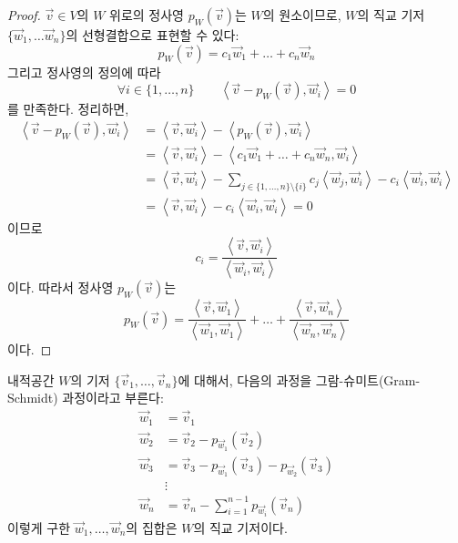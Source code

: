 \documentclass[sections/engineering_mathematics_lecture_note.tex]{subfiles}
\begin{document}
\begin{proof}
    $\vec v \in V$의 $W$ 위로의 정사영 $p_W (\vec v)$는 $W$의 원소이므로, $W$의 직교 기저 $\{\vec w_1, \dots \vec w_n\}$의 선형결합으로 표현할 수 있다:
    \begin{equation*}
        p_W (\vec v) = c_1 \vec w_1 + \dots + c_n \vec w_n
    \end{equation*}
    그리고 정사영의 정의에 따라
    \begin{equation*}
        \forall i \in \{1, \dots, n\} \qquad \left<\vec v - p_W (\vec v), \vec w_i\right> = 0
    \end{equation*}
    를 만족한다.
    정리하면,
    \begin{align*}
        \left<\vec v - p_W (\vec v), \vec w_i\right> &= \left<\vec v, \vec w_i\right> - \left<p_W (\vec v), \vec w_i\right>\\
                                                     &= \left<\vec v, \vec w_i \right> - \left<c_1 \vec w_1 + \dots + c_n \vec w_n, \vec w_i\right>\\
                                                     &= \left<\vec v, \vec w_i \right> - \sum_{j \in \{1, \dots, n\} \setminus \{i\}} c_j \left<\vec w_j, \vec w_i\right> - c_i \left<\vec w_i, \vec w_i\right>\\
                                                     &= \left<\vec v, \vec w_i \right> - c_i \left<\vec w_i, \vec w_i\right> = 0
    \end{align*}
    이므로
    \begin{equation*}
        c_i = \frac{\left<\vec v, \vec w_i\right>}{\left<\vec w_i, \vec w_i\right>}
    \end{equation*}
    이다.
    따라서 정사영 $p_W (\vec v)$는
    \begin{equation*}
        p_W (\vec v) = \frac{\left<\vec v, \vec w_1\right>}{\left<\vec w_1, \vec w_1\right>} + \dots + \frac{\left<\vec v, \vec w_n\right>}{\left<\vec w_n, \vec w_n\right>}
    \end{equation*}
    이다.
\end{proof}

\begin{theorem} 
    내적공간 $W$의 기저 $\{\vec v_1, \dots, \vec v_n\}$에 대해서, 다음의 과정을 그람-슈미트(Gram-Schmidt) 과정이라고 부른다:
    \begin{align*}
        \vec w_1 &= \vec v_1\\
        \vec w_2 &= \vec v_2 - p_{\vec w_1} (\vec v_2)\\
        \vec w_3 &= \vec v_3 - p_{\vec w_1} (\vec v_3) - p_{\vec w_2} (\vec v_3)\\
                 &\vdots\\
        \vec w_n &= \vec v_n - \sum_{i = 1}^{n - 1} p_{\vec w_i} (\vec v_n)
    \end{align*}
    이렇게 구한 $\vec w_1, \dots, \vec w_n$의 집합은 $W$의 직교 기저이다.
\end{theorem}
\end{document}

